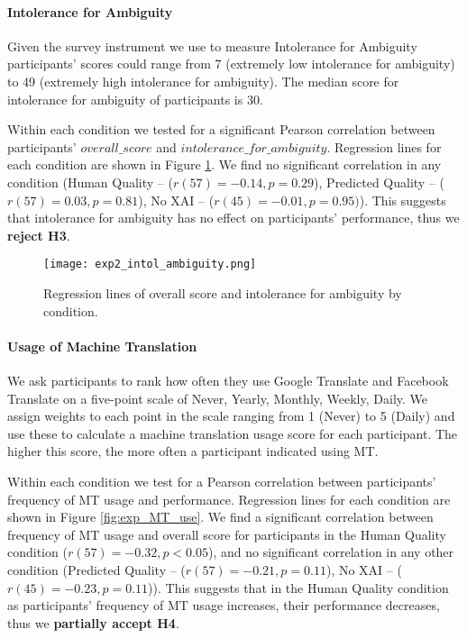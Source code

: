 \paragraph{Intolerance for Ambiguity} 

Given the survey instrument we use to measure Intolerance for Ambiguity\cite{gellerTolerance1993} participants’ scores could range from 7 (extremely low intolerance for ambiguity) to 49 (extremely high intolerance for ambiguity). The median score for intolerance for ambiguity of participants is 30. 

Within each condition we tested for a significant Pearson correlation between participants’ $overall\_score$ and $intolerance\_for\_ambiguity$. Regression lines for each condition are shown in Figure \ref{fig:exp_intol_ambiguity}. We find no significant correlation in any condition (Human Quality -- ($r(57) = -0.14, p = 0.29$), Predicted Quality --  ($r(57) = 0.03, p = 0.81$), No XAI -- ($r(45) = -0.01, p = 0.95)$). This suggests that intolerance for ambiguity has no effect on participants' performance, thus we \textbf{reject H3}. 

\begin{figure}[h!]
    \centering
    \texttt{[image: exp2\_intol\_ambiguity.png]}
    \caption{Regression lines of overall score and intolerance for ambiguity by condition.}
    \label{fig:exp_intol_ambiguity}
\end{figure}

\paragraph{Usage of Machine Translation} 

We ask participants to rank how often they use Google Translate and Facebook Translate on a five-point scale of Never, Yearly, Monthly, Weekly, Daily. We assign weights to each point in the scale ranging from 1 (Never) to 5 (Daily) and use these to calculate a machine translation usage score for each participant. The higher this score, the more often a participant indicated using MT. 

Within each condition we test for a Pearson correlation between participants’ frequency of MT usage and performance. Regression lines for each condition are shown in Figure \ref{fig:exp_MT_use}. We find a significant correlation between frequency of MT usage and overall score for participants in the Human Quality condition ($r(57) = -0.32, p < 0.05$), and no significant correlation in any other condition (Predicted Quality -- ($r(57) = -0.21, p = 0.11$), No XAI -- ($r(45) = -0.23, p = 0.11$)). This suggests that in the Human Quality condition as participants’ frequency of MT usage increases, their performance decreases, thus we \textbf{partially accept H4}.


